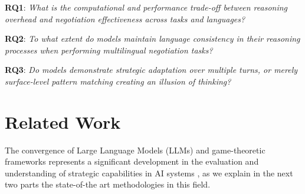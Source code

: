 \documentclass[11pt]{article}
\begin{document}
\noindent\textbf{RQ1}: \textit{What is the computational and performance trade-off between reasoning overhead and negotiation effectiveness across tasks and languages?}

\noindent\textbf{RQ2}: \textit{To what extent do models maintain language consistency in their reasoning processes when performing multilingual negotiation tasks?}

\noindent\textbf{RQ3}: \textit{Do models demonstrate strategic adaptation over multiple turns, or merely surface-level pattern matching creating an illusion of thinking?}


\section{Related Work}

The convergence of Large Language Models (LLMs) and game-theoretic frameworks represents a significant development in the evaluation and understanding of strategic capabilities in AI systems \cite{sun2025gametheorymeetslarge}, as we explain in the next two parts the state-of-the art methodologies in this field.
\end{document}
